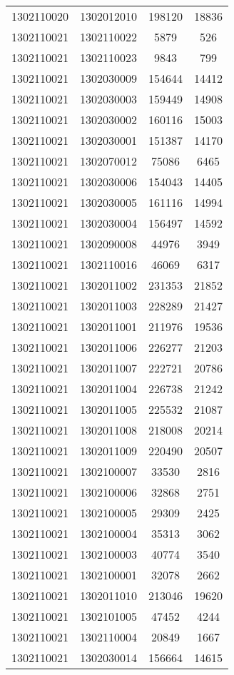 \begin{longtable}{llcc}
1302110020 & 1302012010 & 198120 & 18836\\
1302110021 & 1302110022 & 5879 & 526\\
1302110021 & 1302110023 & 9843 & 799\\
1302110021 & 1302030009 & 154644 & 14412\\
1302110021 & 1302030003 & 159449 & 14908\\
1302110021 & 1302030002 & 160116 & 15003\\
1302110021 & 1302030001 & 151387 & 14170\\
1302110021 & 1302070012 & 75086 & 6465\\
1302110021 & 1302030006 & 154043 & 14405\\
1302110021 & 1302030005 & 161116 & 14994\\
1302110021 & 1302030004 & 156497 & 14592\\
1302110021 & 1302090008 & 44976 & 3949\\
1302110021 & 1302110016 & 46069 & 6317\\
1302110021 & 1302011002 & 231353 & 21852\\
1302110021 & 1302011003 & 228289 & 21427\\
1302110021 & 1302011001 & 211976 & 19536\\
1302110021 & 1302011006 & 226277 & 21203\\
1302110021 & 1302011007 & 222721 & 20786\\
1302110021 & 1302011004 & 226738 & 21242\\
1302110021 & 1302011005 & 225532 & 21087\\
1302110021 & 1302011008 & 218008 & 20214\\
1302110021 & 1302011009 & 220490 & 20507\\
1302110021 & 1302100007 & 33530 & 2816\\
1302110021 & 1302100006 & 32868 & 2751\\
1302110021 & 1302100005 & 29309 & 2425\\
1302110021 & 1302100004 & 35313 & 3062\\
1302110021 & 1302100003 & 40774 & 3540\\
1302110021 & 1302100001 & 32078 & 2662\\
1302110021 & 1302011010 & 213046 & 19620\\
1302110021 & 1302101005 & 47452 & 4244\\
1302110021 & 1302110004 & 20849 & 1667\\
1302110021 & 1302030014 & 156664 & 14615\\

\end{longtable}
